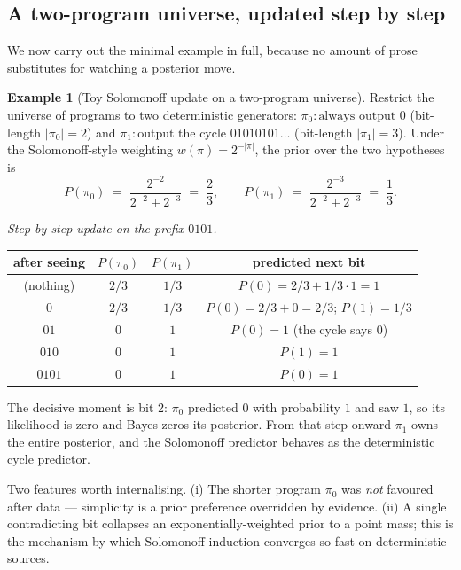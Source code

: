 \documentclass[12pt,a4paper]{article}
\theoremstyle{plain}
\theoremstyle{definition}
\newtheorem{example}[theorem]{Example}
\begin{document}
\subsection*{A two-program universe, updated step by step}

We now carry out the minimal example in full, because no amount of
prose substitutes for watching a posterior move.

\begin{example}[Toy Solomonoff update on a two-program universe]
\label{ex:toy-solomonoff}
Restrict the universe of programs to two deterministic generators:
$\pi_0 : \text{always output }0$ (bit-length $|\pi_0| = 2$) and
$\pi_1 : \text{output the cycle } 01010101\ldots$ (bit-length
$|\pi_1| = 3$).  Under the Solomonoff-style weighting
$w(\pi) = 2^{-|\pi|}$, the prior over the two hypotheses is
\[
  P(\pi_0) \;=\; \frac{2^{-2}}{2^{-2} + 2^{-3}} \;=\; \frac{2}{3},
  \qquad
  P(\pi_1) \;=\; \frac{2^{-3}}{2^{-2} + 2^{-3}} \;=\; \frac{1}{3}.
\]

\noindent\emph{Step-by-step update on the prefix $0101$.}

\begin{center}
\begin{tabular}{c|cc|c}
after seeing & $P(\pi_0)$ & $P(\pi_1)$ & predicted next bit \\\hline
(nothing) & $2/3$ & $1/3$ & $P(0)=2/3+1/3\cdot 1=1$ \\
$0$       & $2/3$ & $1/3$ & $P(0)=2/3+0=2/3$; $P(1)=1/3$ \\
$01$      & $0$   & $1$   & $P(0)=1$ (the cycle says $0$) \\
$010$     & $0$   & $1$   & $P(1)=1$ \\
$0101$    & $0$   & $1$   & $P(0)=1$ \\
\end{tabular}
\end{center}

\noindent The decisive moment is bit 2: $\pi_0$ predicted $0$ with
probability $1$ and saw $1$, so its likelihood is zero and Bayes
zeros its posterior.  From that step onward $\pi_1$ owns the entire
posterior, and the Solomonoff predictor behaves as the deterministic
cycle predictor.

Two features worth internalising.  (i) The shorter program $\pi_0$
was \emph{not} favoured after data --- simplicity is a prior
preference overridden by evidence.  (ii) A single contradicting bit
collapses an exponentially-weighted prior to a point mass; this is
the mechanism by which Solomonoff induction converges so fast on
deterministic sources.


\end{example}
\end{document}
